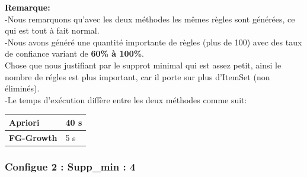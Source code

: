 \documentclass[12pt,a4paper,oneside]{book}
\begin{document}
	\textbf{Remarque:}\\
	-Nous remarquons qu'avec les deux méthodes les mêmes règles sont générées, ce qui est tout à fait normal.\\
	-Nous avons généré une quantité importante de règles (plus de 100) avec des taux de confiance variant de \textbf{60\% à 100\%}.\\
	Chose que nous justifiant par le supprot minimal qui est assez petit, ainsi le nombre de régles est plus important, car il porte sur plus d'ItemSet (non éliminés).\\
	-Le temps d'exécution diffère entre les deux méthodes comme suit:
	\begin{center}
		\begin{tabular}{|p{5cm}|p{5cm}|}
			\hline
			\textbf{Apriori} &
			40 s
			\\
			\hline
			
			\textbf{FG-Growth} 
			&
			\textbf{ }%
			5 s
			\\
			\hline
			
		\end{tabular} 
	\end{center}
	
	
	
	\subsubsection*{Configue 2 : Supp\_min : 4}
	
\end{document}
